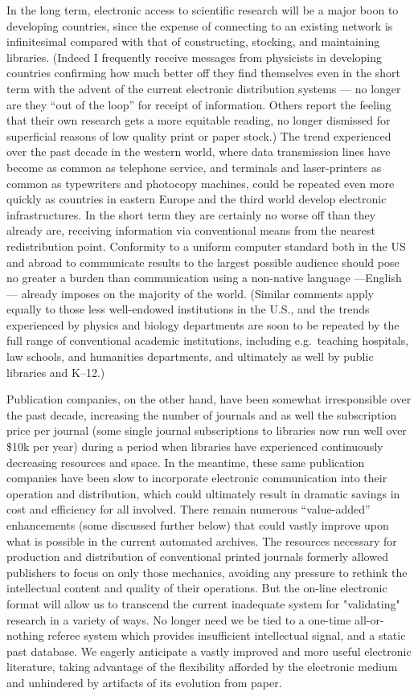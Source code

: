In the long term, electronic access to scientific research will be a major boon
to developing countries, since the expense of connecting to an existing network
is infinitesimal compared with that of constructing, stocking, and maintaining
libraries. (Indeed I frequently receive messages from physicists in developing
countries confirming how much better off they find themselves even in the short
term with the advent of the current electronic distribution systems --- no
longer are they ``out of the loop'' for receipt of information. Others report
the feeling that their own research gets a more equitable reading, no longer
dismissed for superficial reasons of low quality print or paper stock.) The
trend experienced over the past decade in the western world, where data
transmission lines have become as common as telephone service, and terminals
and laser-printers as common as typewriters and photocopy machines, could be
repeated even more quickly as countries in eastern Europe and the third world
develop electronic infrastructures. In the short term they are certainly no
worse off than they already are, receiving information via conventional means
from the nearest redistribution point. Conformity to a uniform computer
standard both in the US and abroad to communicate results to the largest
possible audience should pose no greater a burden than communication using a
non-native language ---English--- already imposes on the majority of the world.
(Similar comments apply equally to those less well-endowed institutions in the
U.S., and the trends experienced by physics and biology departments are soon to
be repeated by the full range of conventional academic institutions, including
e.g.\ teaching hospitals, law schools, and humanities departments, and
ultimately as well by public libraries and K--12.)

Publication companies, on the other hand, have been somewhat irresponsible over
the past decade, increasing the number of journals and as well the subscription
price per journal (some single journal subscriptions to libraries now run well
over \$10k per year) during a period when libraries have experienced
continuously decreasing resources and space. In the meantime, these
same publication companies have been slow to incorporate electronic
communication into their operation and distribution, which could ultimately
result in dramatic savings in cost and efficiency for all involved. There
remain numerous ``value-added'' enhancements (some discussed further below)
that could vastly improve upon what is possible in the current automated
archives. The resources necessary for production and distribution of
conventional printed journals formerly allowed publishers to focus on only
those mechanics, avoiding any pressure to rethink the intellectual content and
quality of their operations.
But the on-line electronic format will allow us to transcend the
current inadequate system for "validating" research in a variety of ways.
No longer need we be tied to a one-time all-or-nothing referee system
which provides insufficient intellectual signal, and a static past database.
We eagerly anticipate a vastly improved and more useful electronic literature,
taking advantage of the flexibility afforded by the electronic medium
and unhindered by artifacts of its evolution from paper.

